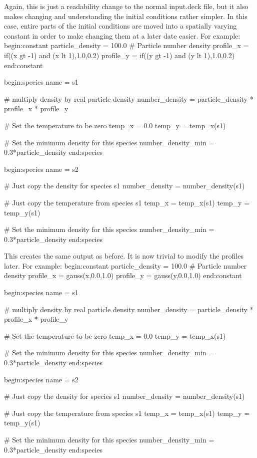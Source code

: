 \documentclass[12pt,a4paper]{article}
\newenvironment{boxverbatim}{\lboxverbatim{none}}{\endlboxverbatim}
\begin{document}
Again, this is just a readability change to the normal input.deck file, but it
also makes changing and understanding the initial conditions rather
simpler. In this case, entire parts of the initial conditions are moved into a
spatially varying constant in order to make changing them at a later date
easier. For example:
\begin{boxverbatim}
begin:constant
   particle_density = 100.0 # Particle number density
   profile_x = if((x gt -1) and (x lt 1),1.0,0.2)
   profile_y = if((y gt -1) and (y lt 1),1.0,0.2)
end:constant

begin:species
   name = s1

   # multiply density by real particle density
   number_density = particle_density * profile_x * profile_y

   # Set the temperature to be zero
   temp_x = 0.0
   temp_y = temp_x(s1)

   # Set the minimum density for this species
   number_density_min = 0.3*particle_density
end:species

begin:species
   name = s2

   # Just copy the density for species s1
   number_density = number_density(s1)

   # Just copy the temperature from species s1
   temp_x = temp_x(s1)
   temp_y = temp_y(s1)

   # Set the minimum density for this species
   number_density_min = 0.3*particle_density
end:species
\end{boxverbatim}

This creates the same output as before. It is now trivial to modify the
profiles later. For example:
\begin{boxverbatim}
begin:constant
   particle_density = 100.0 # Particle number density
   profile_x = gauss(x,0.0,1.0)
   profile_y = gauss(y,0.0,1.0)
end:constant

begin:species
   name = s1

   # multiply density by real particle density
   number_density = particle_density * profile_x * profile_y

   # Set the temperature to be zero
   temp_x = 0.0
   temp_y = temp_x(s1)

   # Set the minimum density for this species
   number_density_min = 0.3*particle_density
end:species

begin:species
   name = s2

   # Just copy the density for species s1
   number_density = number_density(s1)

   # Just copy the temperature from species s1
   temp_x = temp_x(s1)
   temp_y = temp_y(s1)

   # Set the minimum density for this species
   number_density_min = 0.3*particle_density
end:species
\end{boxverbatim}
\end{document}
